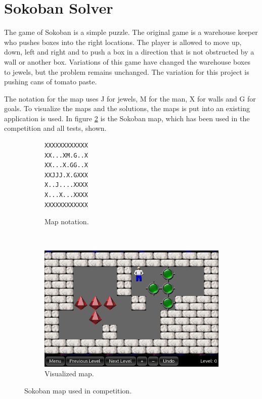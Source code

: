 \section{Sokoban Solver}
The game of Sokoban is a simple puzzle.
The original game is a warehouse keeper who pushes boxes into the right locations.
The player is allowed to move up, down, left and right and to push a box in a direction that is not obstructed by a wall or another box.
Variations of this game have changed the warehouse boxes to jewels, but the problem remains unchanged.
The variation for this project is pushing cans of tomato paste.

The notation for the map uses J for jewels, M for the man, X for walls and G for goals.
To visualize the maps and the solutions, the maps is put into an existing application \cite{url:qml-sokoban} is used.
In figure \ref{fig:sokoban_map_2015_img} is the Sokoban map, which has been used in the competition and all tests, shown.

\begin{figure}[h]
 \centering
 \begin{subfigure}{0.16\textwidth}
   \begin{minipage}{\linewidth}
\begin{verbatim}
XXXXXXXXXXXX
XX...XM.G..X
XX...X.GG..X
XXJJJ.X.GXXX
X..J....XXXX
X...X...XXXX
XXXXXXXXXXXX
\end{verbatim}
 \end{minipage}
 \caption{Map notation.}
 \end{subfigure}~~~
 \begin{subfigure}{0.3\textwidth}
  \includegraphics[width=\linewidth]{img/sokoban_2015}
 \caption{Visualized map.}
 \label{fig:sokoban_map_2015_img}
 \end{subfigure}
 \caption{Sokoban map used in competition.}
\end{figure}

